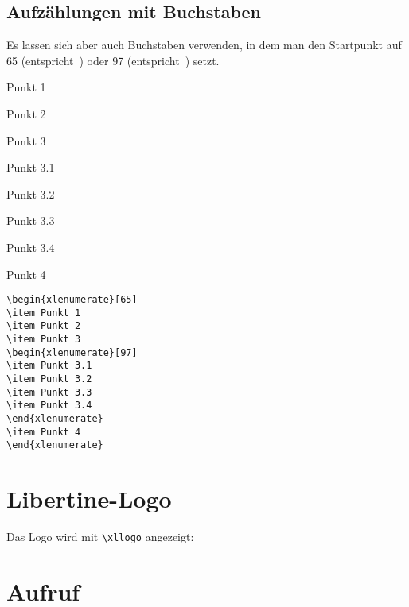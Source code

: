 \documentclass{fontdokuold}
\begin{document}
\newpage
\subsection{Aufzählungen mit Buchstaben}

Es lassen sich aber auch Buchstaben verwenden, in dem man den Startpunkt
auf 65 (entspricht~) oder 97 (entspricht~) setzt.



\begin{xlenumerate}[65]
\item Punkt 1
\item Punkt 2
\item Punkt 3
\begin{xlenumerate}[97]
\item Punkt 3.1
\item Punkt 3.2
\item Punkt 3.3
\item Punkt 3.4
\end{xlenumerate}
\item Punkt 4
\end{xlenumerate}

\begin{lstlisting}
\begin{xlenumerate}[65]
\item Punkt 1
\item Punkt 2
\item Punkt 3
\begin{xlenumerate}[97]
\item Punkt 3.1
\item Punkt 3.2
\item Punkt 3.3
\item Punkt 3.4
\end{xlenumerate}
\item Punkt 4
\end{xlenumerate}
\end{lstlisting}



\section{Libertine-Logo}

Das Logo wird mit \verb|\xllogo| angezeigt: {\Huge\xllogo}


\section{Aufruf}
\end{document}
